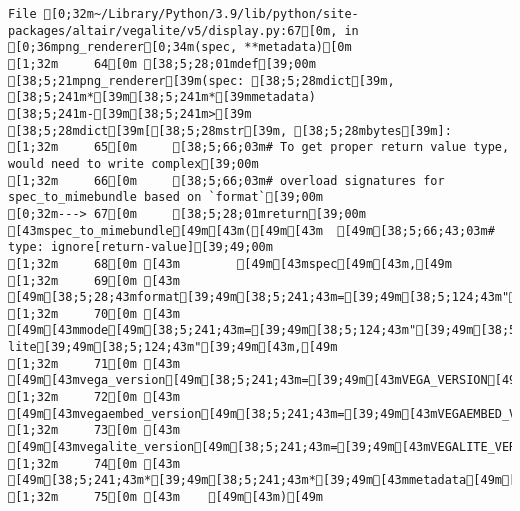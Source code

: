\documentclass[
  letterpaper,
  DIV=11,
  numbers=noendperiod]{scrartcl}
\begin{document}
\begin{verbatim}
File [0;32m~/Library/Python/3.9/lib/python/site-packages/altair/vegalite/v5/display.py:67[0m, in [0;36mpng_renderer[0;34m(spec, **metadata)[0m
[1;32m     64[0m [38;5;28;01mdef[39;00m [38;5;21mpng_renderer[39m(spec: [38;5;28mdict[39m, [38;5;241m*[39m[38;5;241m*[39mmetadata) [38;5;241m-[39m[38;5;241m>[39m [38;5;28mdict[39m[[38;5;28mstr[39m, [38;5;28mbytes[39m]:
[1;32m     65[0m     [38;5;66;03m# To get proper return value type, would need to write complex[39;00m
[1;32m     66[0m     [38;5;66;03m# overload signatures for spec_to_mimebundle based on `format`[39;00m
[0;32m---> 67[0m     [38;5;28;01mreturn[39;00m [43mspec_to_mimebundle[49m[43m([49m[43m  [49m[38;5;66;43;03m# type: ignore[return-value][39;49;00m
[1;32m     68[0m [43m        [49m[43mspec[49m[43m,[49m
[1;32m     69[0m [43m        [49m[38;5;28;43mformat[39;49m[38;5;241;43m=[39;49m[38;5;124;43m"[39;49m[38;5;124;43mpng[39;49m[38;5;124;43m"[39;49m[43m,[49m
[1;32m     70[0m [43m        [49m[43mmode[49m[38;5;241;43m=[39;49m[38;5;124;43m"[39;49m[38;5;124;43mvega-lite[39;49m[38;5;124;43m"[39;49m[43m,[49m
[1;32m     71[0m [43m        [49m[43mvega_version[49m[38;5;241;43m=[39;49m[43mVEGA_VERSION[49m[43m,[49m
[1;32m     72[0m [43m        [49m[43mvegaembed_version[49m[38;5;241;43m=[39;49m[43mVEGAEMBED_VERSION[49m[43m,[49m
[1;32m     73[0m [43m        [49m[43mvegalite_version[49m[38;5;241;43m=[39;49m[43mVEGALITE_VERSION[49m[43m,[49m
[1;32m     74[0m [43m        [49m[38;5;241;43m*[39;49m[38;5;241;43m*[39;49m[43mmetadata[49m[43m,[49m
[1;32m     75[0m [43m    [49m[43m)[49m


\end{verbatim}
\end{document}
